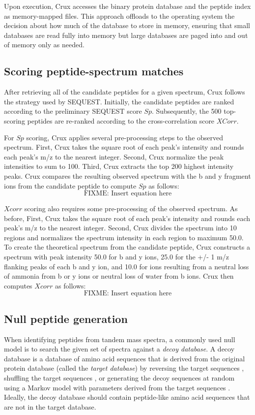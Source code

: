 \documentclass{bioinfo}
\renewcommand{\cite}{\citep}
\begin{document}
Upon execution, Crux accesses the binary protein database and the
peptide index as memory-mapped files.  This approach offloads to the
operating system the decision about how much of the database to store
in memory, ensuring that small databases are read fully into memory
but large databases are paged into and out of memory only as needed.

\subsection{Scoring peptide-spectrum matches}

After retrieving all of the candidate peptides for a given spectrum,
Crux follows the strategy used by SEQUEST.  Initially, the candidate
peptides are ranked according to the preliminary SEQUEST score $Sp$.
Subsequently, the 500 top-scoring peptides are re-ranked according to
the cross-correlation score $XCorr$.

For $Sp$ scoring, Crux applies several pre-processing steps to the
observed spectrum.  First, Crux takes the square root of each peak's
intensity and rounds each peak's m/z to the nearest integer.  Second,
Crux normalize the peak intensities to sum to 100.  Third, Crux
extracts the top 200 highest intensity peaks.  Crux compares the
resulting observed spectrum with the b and y fragment ions from the
candidate peptide to compute $Sp$ as follows:
\[
\mbox{FIXME: Insert equation here}
\]

$Xcorr$ scoring also requires some pre-processing of the observed
spectrum.  As before, First, Crux takes the square root of each peak's
intensity and rounds each peak's m/z to the nearest integer.  Second,
Crux divides the spectrum into 10 regions and normalizes the spectrum
intensity in each region to maximum 50.0. To create the theoretical
spectrum from the candidate peptide, Crux constructs a spectrum with
peak intensity 50.0 for b and y ions, 25.0 for the +/- 1 m/z flanking
peaks of each b and y ion, and 10.0 for ions resulting from a neutral
loss of ammonia from b or y ions or neutral loss of water
from b ions.  Crux then computes $Xcorr$ as follows:
\[
\mbox{FIXME: Insert equation here}
\]

\subsection{Null peptide generation}

When identifying peptides from tandem mass spectra, a commonly used
null model is to search the given set of spectra against a {\em decoy
database}.  A decoy database is a database of amino acid sequences
that is derived from the original protein database (called the {\em
target database}) by reversing the target sequences
\cite{moore:qscore}, shuffling the target sequences
\cite{klammer:effects}, or generating the decoy sequences at random
using a Markov model with parameters derived from the target sequences
\cite{colinge:olav}.  Ideally, the decoy database should contain
peptide-like amino acid sequences that are not in the target database.
\end{document}
